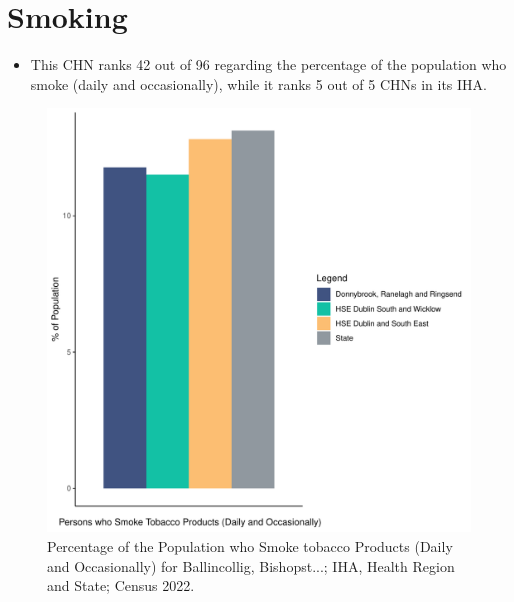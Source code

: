 \documentclass{article}
\begin{document}
\pagebreak

\section{Smoking}\label{sect:Smoking}
\begin{itemize}
\item This CHN ranks  42 out of 96 regarding the percentage of the population who smoke (daily and occasionally), while it ranks   5 out of 5 CHNs in its IHA.
\end{itemize}
\begin{figure}[H]
	\centering
	\includegraphics[width = 120mm]{../figures/SmokingED.pdf}
	\caption{Percentage of the Population who Smoke tobacco Products (Daily and Occasionally) for Ballincollig, Bishopst...; IHA, Health Region and State; Census 2022.}
	\label{fig:2ae19629-1a6a-13a3-e055-000000000001}
	\end{figure}
	
\end{document}
